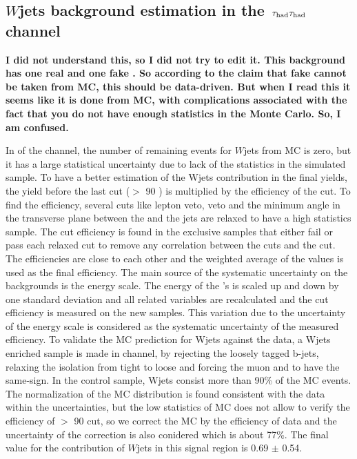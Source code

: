 \subsection{\texorpdfstring{$W$jets background estimation in the $\,\tau_{\rm had}\tau_{\rm had}$ channel}{Wjets background estimation in the tau-tau channel}}

{\bf I did not understand this, so I did not try to edit it.  This background has one real \Tau and one fake \Tau.  So according to the claim
that fake \Tau cannot be taken from MC, this should be data-driven.  
But when I read this it seems like it is done from MC, with complications
associated with the fact that you do not have enough statistics in the Monte Carlo.  So, I am confused.}

In \binone of the \tauTau channel, the number of remaining events for $W$jets from MC is zero, but it has a large statistical uncertainty due to 
lack of the statistics in the simulated sample. 
To have a better estimation of the Wjets contribution in the final yields,
the yield before the last cut (\mttwo $>$ 90 \GeV) is multiplied by the efficiency of the cut. To find the efficiency, several cuts like 
lepton veto, \Z veto and the minimum angle in the transverse plane between the \MET and the jets 
are relaxed to have a high statistics sample. The cut efficiency is found in the exclusive samples that either fail or pass each relaxed cut
to remove any correlation between the cuts and the \mttwo cut.
The efficiencies are close to each other and the weighted average of the values is used as the final efficiency.
The main source of the systematic uncertainty on the backgrounds 
is the \Tau energy scale. The energy of the \Tau's is scaled up and down by one standard deviation and all related variables are 
recalculated and the cut efficiency is measured on the new samples. 
This variation due to the uncertainty of the \Tau energy scale is considered as the systematic uncertainty of the measured efficiency.
To validate the MC prediction for Wjets against the data, a Wjets enriched sample is made in \muTau channel, 
by rejecting the loosely tagged b-jets, relaxing the \Tau isolation from tight to loose and forcing the muon and \Tau to have the same-sign. 
In the control sample, Wjets consist more than 90\% of the MC events. The normalization of the MC distribution  is found consistent
with the data within the uncertainties, but the low statistics of MC does not allow to verify the efficiency of \mttwo $>$ 90 \GeV cut, 
so we correct the MC by the efficiency of data and the uncertainty of the correction is also conidered which is about 77\%. 
The final value for the contribution of $W$jets in this signal region is 0.69 $\pm$ 0.54.

